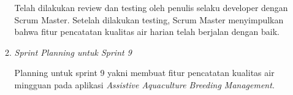 \begin{enumerate}[listparindent=2em]
\begin{enumerate}
	Telah dilakukan review dan testing oleh penulis selaku developer dengan Scrum Master. Setelah dilakukan testing, Scrum Master menyimpulkan bahwa fitur pencatatan kualitas air harian telah berjalan dengan baik.

	\item{\textit{Sprint Planning untuk Sprint 9}}
	
	Planning untuk sprint 9 yakni membuat fitur pencatatan kualitas air mingguan pada aplikasi \textit{Assistive Aquaculture Breeding Management}.
\end{enumerate}
\end{enumerate}